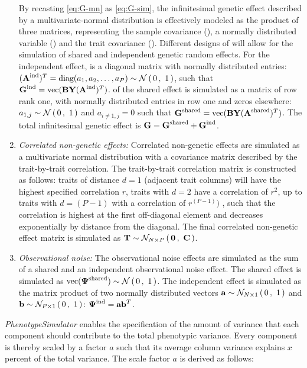 \begin{enumerate}
By recasting \cref{eq:G-mn} as \cref{eq:G-sim}, the infinitesimal genetic effect  described by a multivariate-normal distribution is effectively modeled as the product of three matrices, representing the sample covariance (), a normally distributed variable () and the trait covariance (). Different designs of  will allow for the simulation of shared and independent genetic random effects. For the independent effect,  is a diagonal matrix with normally distributed entries: \((\boldsymbol{\mathbf{A}}^\text{ind})^T = \text{diag}(a_1, a_2,  \dotsc , a_P) \sim \mathcal{N}\left(\,{0}\,,~{1}\,\right)\), such that \(\boldsymbol{\mathbf{G}}^\text{ind} =  \text{vec}(\boldsymbol{\mathbf{BY}}(\boldsymbol{\mathbf{A}}^\text{ind})^T) \).  of the shared effect is simulated as a matrix of row rank one, with normally distributed entries in row one and zeros elsewhere: \(a_{1,j} \sim \mathcal{N}\left(\,{0}\,,~{1}\,\right)\) and \(a_{i \neq 1,j} = 0\) such that \(\boldsymbol{\mathbf{G}}^\text{shared} =  \text{vec}(\boldsymbol{\mathbf{BY}}(\boldsymbol{\mathbf{A}}^\text{shared})^T) \). The total infinitesimal genetic effect  is \(\boldsymbol{\mathbf{G}} = \boldsymbol{\mathbf{G}}^\text{shared} + \boldsymbol{\mathbf{G}}^\text{ind}\). 
%
\item \textit{Correlated non-genetic effects:}  Correlated non-genetic effects are simulated as a multivariate normal distribution with a covariance matrix described by the trait-by-trait correlation. The trait-by-trait correlation matrix  is constructed as follows: traits of distance \(d=1\) (adjacent trait columns) will have the highest specified correlation \(r\), traits with \(d=2\) have a correlation of \(r^2\), up to traits with \(d=(P - 1)\) with a correlation of \(r^{(P - 1)})\) , such that the correlation is highest at the first off-diagonal element and decreases exponentially by distance from the diagonal. The final correlated non-genetic effect matrix is simulated as \(\boldsymbol{\mathbf{T}} \sim \mathcal{N}_{N\times P}\left(\, {\boldsymbol{\mathbf{0}}} \,,~{\boldsymbol{\mathbf{C}}} \,\right)\).
%
\item \textit{Observational noise:} The observational noise effects \tmat{\Psi} are simulated as the sum of a shared and an independent observational noise effect. The shared effect  is simulated as \(\text{vec}(\boldsymbol{\mathbf{\Psi}}^\text{shared}) \sim \mathcal{N}\left(\,{0}\,,~{1}\,\right)\). The independent  effect  is simulated as the matrix product of two normally distributed vectors \(\boldsymbol{\mathbf{a}} \sim \mathcal{N}_{N\times 1}\left(\, {0} \,,~{1} \,\right)\) and \(\boldsymbol{\mathbf{b}} \sim \mathcal{N}_{P\times 1}\left(\, {0} \,,~{1} \,\right)\): \(\boldsymbol{\mathbf{\Psi}}^\text{ind} = \boldsymbol{\mathbf{ab}}^T\).
\end{enumerate}
%
\textit{PhenotypeSimulator} enables the specification of the amount of variance that each component should contribute to the total phenotypic variance. Every component is thereby scaled by a factor \(a\) such that its average column variance explains \(x\) percent of the total variance. The scale factor \(a\) is derived as follows: 
